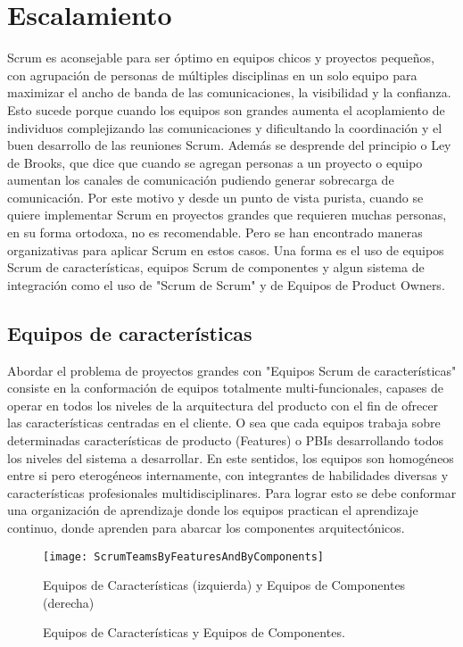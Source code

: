 \chapter{Escalamiento}

Scrum es aconsejable para ser óptimo en equipos chicos y proyectos pequeños, con agrupación de personas de múltiples disciplinas en un solo equipo para maximizar el ancho de banda de las comunicaciones, la visibilidad y la confianza. Esto sucede porque cuando los equipos son grandes aumenta el acoplamiento de individuos complejizando las comunicaciones y dificultando la coordinación y el buen desarrollo de las reuniones Scrum. Además se desprende del principio o Ley de Brooks, que dice que cuando se agregan personas a un proyecto o equipo aumentan los canales de comunicación pudiendo generar sobrecarga de comunicación. Por este motivo y desde un punto de vista purista, cuando se quiere implementar Scrum en proyectos grandes que requieren muchas personas, en su forma ortodoxa, no es recomendable. Pero se han encontrado maneras organizativas para aplicar Scrum en estos casos. Una forma es el uso de equipos Scrum de características, equipos Scrum de componentes y algun sistema de integración como el uso de "Scrum de Scrum" y de Equipos de Product Owners.

\section{Equipos de características}

Abordar el problema de proyectos grandes con "Equipos Scrum de características" consiste en la conformación de equipos totalmente multi-funcionales, capases de operar en todos los niveles de la arquitectura del producto con el fin de ofrecer las características centradas en el cliente. O sea que cada equipos trabaja sobre determinadas características de producto (Features) o PBIs desarrollando todos los niveles del sistema a desarrollar. En este sentidos, los equipos son homogéneos entre si pero eterogéneos internamente, con integrantes de habilidades diversas y características profesionales multidisciplinares. Para lograr esto se debe conformar una organización de aprendizaje donde los equipos practican el aprendizaje continuo, donde aprenden para abarcar los componentes arquitectónicos. 

\begin{figure}[h]
  \centering
  \texttt{[image: ScrumTeamsByFeaturesAndByComponents]}
  \caption{Equipos de Características y Equipos de Componentes.}
  Equipos de Características (izquierda) y Equipos de Componentes (derecha)
  \centering
  \label{fig:ScrumTeamsByFeaturesAndByComponents} %
\end{figure}

